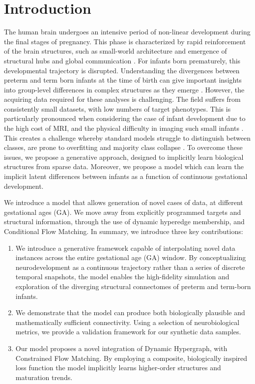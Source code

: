 \documentclass[sigconf, review]{acmart}
\begin{document}
\section{Introduction}
The human brain undergoes an intensive period of non-linear development during the final stages of pregnancy. This phase is characterized by rapid reinforcement of the brain structures, such as small-world architecture \cite{sporns_human_2013, karolis2016reinforcement} and emergence of structural hubs and global communication \cite{karolis2016reinforcement, ball2012effect, bauer2017nonlinear, taoudi2022predicting}. For infants born prematurely, this developmental trajectory is disrupted. Understanding the divergences between preterm and term born infants at the time of birth can give important insights into group-level differences in complex structures as they emerge \cite{birch2025exploring, schuetze2016morphological, ball2012effect, ream2018neurologic, lee2021cingulum}.  
However, the acquiring data required for these analyses is challenging. The field suffers from consistently small datasets, with low numbers of target phenotypes. This is particularly pronounced when considering the case of infant development due to the high cost of MRI, and the physical difficulty in imaging such small infants \cite{taoudi2022predicting}. This creates a challenge whereby standard models struggle to distinguish between classes, are prone to overfitting and majority class collapse \cite{birch2025exploring, cui2022braingb, messaritaki2019optimization}. To overcome these issues, we propose a generative approach, designed to implicitly learn biological structures from sparse data. Moreover, we propose a model which can learn the implicit latent differences between infants as a function of continuous gestational development. 

We introduce a model that allows generation of novel cases of data, at different gestational ages (GA). We move away from explicitly programmed targets and structural information, through the use of dynamic hyperedge membership, and Conditional Flow Matching.
In summary, we introduce three key contributions:
\begin{enumerate}
    \item We introduce a generative framework capable of interpolating novel data instances across the entire gestational age (GA) window. By conceptualizing neurodevelopment as a continuous trajectory rather than a series of discrete temporal snapshots, the model enables the high-fidelity simulation and exploration of the diverging structural connectomes of preterm and term-born infants.
    \item We demonstrate that the model can produce both biologically plausible and mathematically sufficient connectivity. Using a selection of neurobiological metrics, we provide a validation framework for our synthetic data samples.
    \item Our model proposes a novel integration of Dynamic Hypergraph, with Constrained Flow Matching. By employing a composite, biologically inspired loss function the model implicitly learns higher-order structures and maturation trends.
    
\end{enumerate}
 
\end{document}
